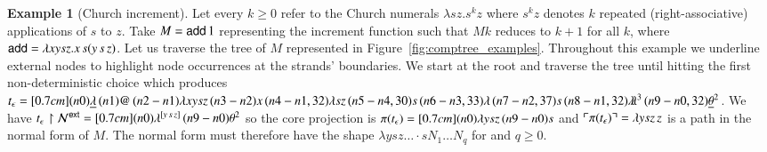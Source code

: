 \documentclass{elsarticle}
\theoremstyle{plain}
\theoremstyle{definition}
\newtheorem{example}{Example}[section]
\newcommand\Nodes{\mathcal{N}}%
\newcommand{\ghostlmd}{{\lambda\!\!\lambda}}
\newcommand{\ghostvar}{\theta}
\def\coresymbol{\pi} %
\newcommand{\core}[1]{\coresymbol(#1)} %
\newcommand{\ExternalNodes}{\Nodes^{\sf ext}}
\begin{document}
\begin{example}[Church increment]
\label{examp:churchincrement}
Let every $k\geq0$ refer to the Church numerals $\lambda s z . s^k z$
where $s^k z$ denotes $k$ repeated (right-associative) applications of $s$ to $z$.
Take $M = {\sf add}\, 1$ representing the increment function such that $M k$ reduces to $k+1$ for all $k$, where ${\sf add} = \lambda x y s z. x\, s (y\, s\, z)$.
Let us traverse the tree of $M$ represented in Figure~\ref{fig:comptree_examples}. Throughout this example we underline external nodes to highlight node occurrences at the strands' boundaries.
We start at the root and traverse the tree until hitting the first non-deterministic choice which produces
$t_\epsilon = \Pstr[0.7cm]{(n0){\underline\lambda }\,(n1){@}\,(n2-n1){\lambda x y s z}\,(n3-n2){x}\,(n4-n1,32){\lambda s z}\,(n5-n4,30){s}\,(n6-n3,33){\lambda }\,(n7-n2,37){s}\,(n8-n1,32){\ghostlmd^3}\,(n9-n0,32){\underline{\ghostvar}^2} }$.
We have $t_\epsilon\filter\ExternalNodes = \Pstr[0.7cm]{(n0){\lambda^{[y\,s\,z]}} \, (n9-n0){{\ghostvar^2}} }$
so the core projection is
$\core{t_\epsilon} = \Pstr[0.7cm]{(n0){\lambda y s z} \, (n9-n0){s} }$
and $\pview{\core{t_\epsilon}} = \lambda y s z \, z$ is a path in the normal form of $M$.
The normal form must therefore have the shape $\lambda y s z \ldots \cdot s N_1 \ldots N_q$ for and $q\geq0$.


\end{example}
\end{document}

